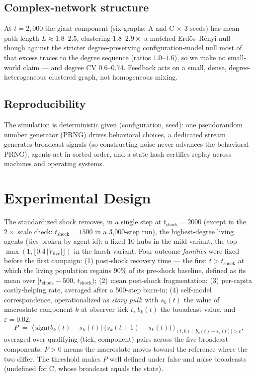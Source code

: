 \documentclass{svproc}
\begin{document}
\subsection{Complex-network structure}
At $t=2{,}000$ the giant component (six graphs: A and C $\times$ 3 seeds) has
mean path length $L\approx1.8$--$2.5$, clustering $1.8$--$2.9\times$ a matched
Erd\H{o}s--R\'enyi null --- though against the stricter degree-preserving
configuration-model null
most of that excess traces to the degree sequence (ratios $1.0$--$1.6$), so we
make no small-world claim --- and degree CV $0.6$--$0.74$. Feedback acts on a
small, dense, degree-heterogeneous clustered graph, not homogeneous mixing.

\subsection{Reproducibility}
The simulation is deterministic given (configuration, seed): one
pseudorandom number generator (PRNG) drives
behavioral choices, a dedicated stream generates broadcast signals (so
constructing noise never advances the behavioral PRNG), agents act in sorted
order, and a state hash certifies replay across machines and operating systems.

\section{Experimental Design}
The standardized shock removes, in a single step at $t_{\mathrm{shock}}=2000$
(except in the $2\times$ scale check: $t_{\mathrm{shock}}=1500$ in a
3{,}000-step run), the
highest-degree living agents (ties broken by agent id): a fixed 10 hubs in
the mild variant, the top $\max(1, \lfloor 0.4\,|V_{\mathrm{live}}|\rfloor)$ in the
harsh variant. Four outcome \emph{families} were fixed before the first
campaign: (1) post-shock recovery time --- the first $t > t_{\mathrm{shock}}$
at which the living population regains $90\%$ of its pre-shock baseline,
defined as its mean over $[t_{\mathrm{shock}}{-}500,\, t_{\mathrm{shock}})$;
(2) mean post-shock fragmentation; (3) per-capita costly-helping rate,
averaged after a 500-step burn-in; (4)
self-model correspondence, operationalized as \emph{story pull}: with
$s_k(t)$ the value of macrostate component $k$ at observer tick $t$,
$b_k(t)$ the broadcast value, and $\varepsilon=0.02$,
\begin{equation}
P \;=\; \Big\langle\, \mathrm{sign}\big(b_k(t)-s_k(t)\big)\,
\big(s_k(t{+}1)-s_k(t)\big) \,\Big\rangle_{(t,k)\,:\,|b_k(t)-s_k(t)|>\varepsilon},
\label{eq:pull}
\end{equation}
averaged over qualifying (tick, component) pairs across the five broadcast
components; $P>0$ means the macrostate moves toward the reference where the
two differ. The threshold makes $P$ well defined under false and noise
broadcasts (undefined for C, whose broadcast equals the state).
\end{document}
